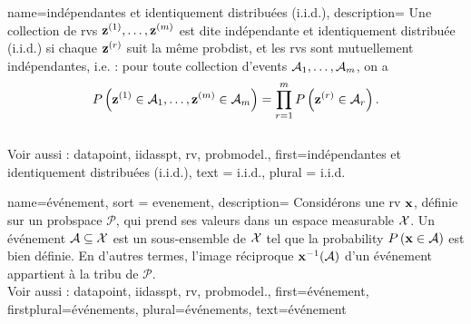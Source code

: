 {name={indépendantes et identiquement distribuées (i.i.d.)}, 
	description={
		Une collection de \glspl{rv} ${\bf z}^{(1)}, \ldots, {\bf z}^{(m)}$ est dite 
		indépendante et identiquement distribuée (i.i.d.) 
		si chaque ${\bf z}^{(r)}$ suit la même \gls{probdist}, et 
		les \glspl{rv} sont mutuellement indépendantes, i.e. : pour toute collection d’\glspl{event} 
		$\mathcal{A}_1, \ldots, \mathcal{A}_m$, on a
		\[
		P\left( {\bf z}^{(1)} \in \mathcal{A}_1, \ldots, {\bf z}^{(m)} \in \mathcal{A}_{m}\right) 
		= \prod_{r=1}^{m} P\left( {\bf z}^{(r)} \in \mathcal{A}_r\right).
		\]
		\\
		Voir aussi : \gls{datapoint}, \gls{iidasspt}, \gls{rv}, \gls{probmodel}.},
	first={indépendantes et identiquement distribuées (i.i.d.)},
    text = {i.i.d.}, plural = {i.i.d.}
}

{name={événement}, sort = {evenement}, 
	description={
		Considérons une \gls{rv} ${\bf x}$, définie sur un \gls{probspace} $\mathcal{P}$, 
		qui prend ses valeurs dans un espace \gls{measurable} $\mathcal{X}$. Un événement $\mathcal{A} \subseteq \mathcal{X}$ 
		est un sous-ensemble de $\mathcal{X}$ tel que la \gls{probability} 
		$P\left({\bf x} \in \mathcal{A}\right)$ est bien définie. En d’autres termes, l’image réciproque 
		${\bf x}^{-1}(\mathcal{A})$ d’un événement appartient à la tribu de $\mathcal{P}$. 
		\\
		Voir aussi : \gls{datapoint}, \gls{iidasspt}, \gls{rv}, \gls{probmodel}.},
	first={événement},
	firstplural={événements},
	plural={événements},
	text={événement} 
}

